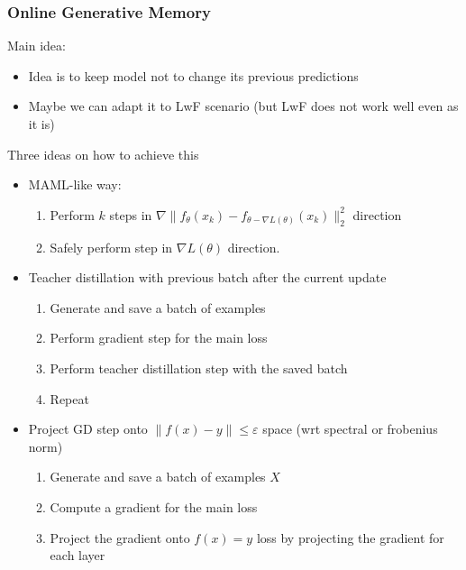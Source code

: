 \documentclass[10pt]{beamer}
\begin{document}
\begin{frame}
    \frametitle{Online Generative Memory}
    
    Main idea:
    \begin{itemize}
        \item Idea is to keep model not to change its previous predictions
        \item Maybe we can adapt it to LwF scenario (but LwF does not work well even as it is)
    \end{itemize}
    
    Three ideas on how to achieve this
    \begin{itemize}
        \item MAML-like way:
        \begin{enumerate}
            \item Perform $k$ steps in $\nabla \| f_{\theta} (x_k) - f_{\theta - \nabla L(\theta)}(x_k) \|_2^2$ direction
            \item Safely perform step in $\nabla L(\theta)$ direction.
        \end{enumerate}
        \item Teacher distillation with previous batch after the current update
        \begin{enumerate}
            \item Generate and save a batch of examples
            \item Perform gradient step for the main loss
            \item Perform teacher distillation step with the saved batch
            \item Repeat
        \end{enumerate}
        \item Project GD step onto $\| f(x) - y \| \leq \varepsilon$ space (wrt spectral or frobenius norm)
        \begin{enumerate}
            \item Generate and save a batch of examples $X$
            \item Compute a gradient for the main loss
            \item Project the gradient onto $f(x) = y$ loss by projecting the gradient for each layer
        \end{enumerate}
    \end{itemize}
\end{frame}
\end{document}
